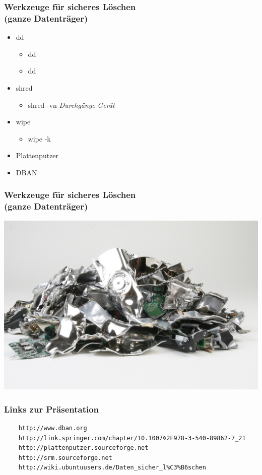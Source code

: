 \begin{frame}
  \frametitle{Werkzeuge für sicheres Löschen\\(ganze Datenträger)}
  \begin{itemize}
    \item dd
      \begin{itemize}
        \item dd  
        \item dd  
      \end{itemize}
    \item shred
      \begin{itemize}
        \item shred -vn \textit{Durchgänge} \textit{Gerät}
      \end{itemize}
    \item wipe
      \begin{itemize}
        \item wipe -k 
      \end{itemize}
    \item Plattenputzer
    \item DBAN
  \end{itemize}
\end{frame}

\begin{frame}
  \frametitle{Werkzeuge für sicheres Löschen\\(ganze Datenträger)}
  \includegraphics[width=0.9\linewidth]{Bilder/HDDFragmente}
\end{frame}

\begin{frame}[fragile]   %
\frametitle{Links zur Präsentation}
  \begin{verbatim}
    http://www.dban.org
    http://link.springer.com/chapter/10.1007%2F978-3-540-89862-7_21
    http://plattenputzer.sourceforge.net
    http://srm.sourceforge.net
    http://wiki.ubuntuusers.de/Daten_sicher_l%C3%B6schen
  \end{verbatim}
\end{frame}

